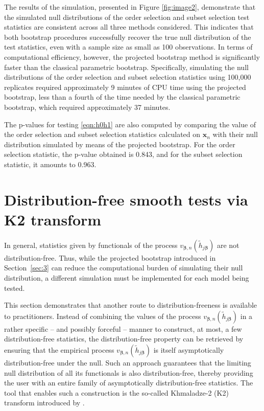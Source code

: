 \documentclass[11pt]{article}
\newcommand{\vect}[1]{\boldsymbol{#1}}
\begin{document}
The results of the simulation, presented in Figure \ref{fig:image2},
demonstrate that the simulated null distributions of the order selection and subset selection test statistics are consistent across all three methods considered. This indicates that both bootstrap procedures successfully recover the true null distribution of the test statistics, even with a sample size as small as 100 observations. In terms of computational efficiency, however, the projected bootstrap method is significantly faster than the classical parametric bootstrap. Specifically, 
simulating the null distributions of the order selection and subset selection statistics using 100,000 replicates required approximately 9 minutes of CPU time using the projected bootstrap, less than a fourth of the time needed by the classical parametric bootstrap, which required approximately 37 minutes.

The p-values for testing \eqref{eqn:h0h1} are also computed by comparing the value of the order selection and subset selection statistics calculated on $\bm{x}_n$
with their null distribution simulated by means of the projected bootstrap. For the order selection statistic, the p-value obtained is 0.843, and for the subset selection statistic, it amounts to 0.963. %

\section{Distribution-free smooth tests via K2 transform} \label{sec:4}
In general, statistics given by functionals of the process $v_{\vect{\beta},n}(\widetilde{h}_{j\vect{\beta}})$ are not distribution-free. 
Thus, while the projected bootstrap introduced in Section~\ref{sec:3} can reduce the computational burden of simulating their null distribution, a different simulation must be implemented for each model being tested. 

This section demonstrates that another route to distribution-freeness is available to practitioners. Instead of combining the values of the process $v_{\vect{\beta},n}(\widetilde{h}_{j\vect{\beta}})$ in a rather specific -- and possibly forceful -- manner to construct, at most, a few distribution-free statistics, the distribution-free property can be retrieved by ensuring that the empirical process $v_{\vect{\beta},n}(\widetilde{h}_{j\vect{\beta}})$ is itself asymptotically distribution-free under the null. Such an approach guarantees that the limiting null distribution of all its functionals is also distribution-free, thereby providing the user with an entire family of asymptotically distribution-free statistics. The tool that enables such a construction is the so-called Khmaladze-2 (K2) transform introduced by \cite{K22016}. 
\end{document}
